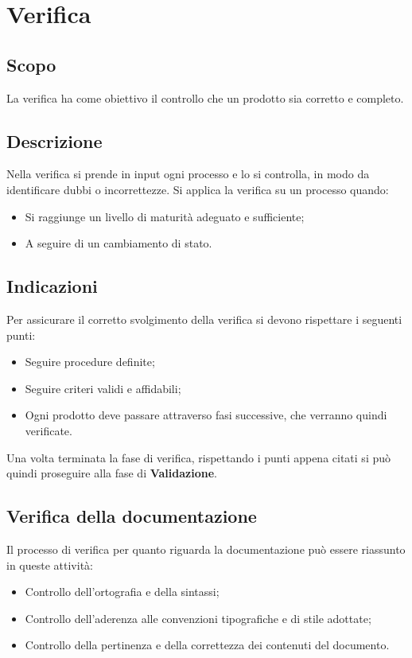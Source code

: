 \section{Verifica}
\subsection{Scopo}
La verifica ha come obiettivo il controllo che un prodotto sia corretto e completo.

\subsection{Descrizione}
Nella verifica si prende in input ogni processo e lo si controlla, in modo da identificare dubbi o incorrettezze.
Si applica la verifica su un processo quando:
\begin{itemize}
  \item Si raggiunge un livello di maturità adeguato e sufficiente;
  \item A seguire di un cambiamento di stato.
\end{itemize}

\subsection{Indicazioni}
Per assicurare il corretto svolgimento della verifica si devono rispettare i seguenti punti:
\begin{itemize}
  \item Seguire procedure definite;
  \item Seguire criteri validi e affidabili;
  \item Ogni prodotto deve passare attraverso fasi successive, che verranno quindi verificate.
\end{itemize}
Una volta terminata la fase di verifica, rispettando i punti appena citati si può quindi proseguire alla fase di \textbf{Validazione}.

\subsection{Verifica della documentazione}
Il processo di verifica per quanto riguarda la documentazione può essere riassunto in queste attività:
\begin{itemize}
  \item Controllo dell'ortografia e della sintassi;
  \item Controllo dell'aderenza alle convenzioni tipografiche e di stile adottate;
  \item Controllo della pertinenza e della correttezza dei contenuti del documento.
\end{itemize}

